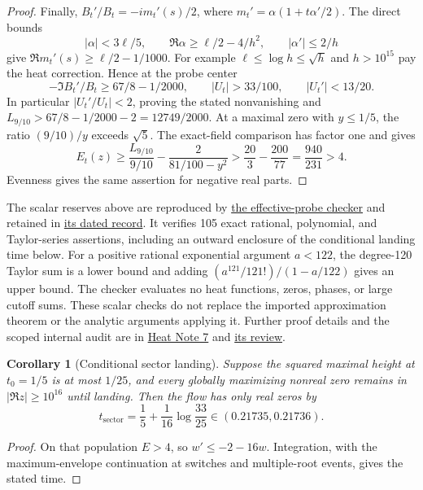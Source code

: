 \documentclass[11pt]{article}
\numberwithin{equation}{section}
\newtheorem{corollary}[theorem]{Corollary}
\theoremstyle{definition}
\theoremstyle{remark}
\begin{document}
\begin{proof}
Finally, \(B_t'/B_t=-im_t'(s)/2\), where
\(m_t'\!=\alpha(1+t\alpha'/2)\).
The direct bounds
\[
 |\alpha|<3\ell/5,\qquad
 \Re\alpha\ge\ell/2-4/h^2,\qquad |\alpha'|\le2/h
\]
give \(\Re m_t'(s)\ge\ell/2-1/1000\).
For example \(\ell\le\log h\le\sqrt h\) and \(h>10^{15}\)
pay the heat correction.  Hence at the probe center
\[
 -\Im B_t'/B_t\ge67/8-1/2000,\qquad
 |U_t|>33/100,\qquad |U_t'|<13/20.
\]
In particular \(|U_t'/U_t|<2\), proving the stated nonvanishing and
\(L_{9/10}>67/8-1/2000-2=12749/2000\).
At a maximal zero with \(y\le1/5\), the ratio \((9/10)/y\) exceeds
\(\sqrt5\).  The exact-field comparison has factor one and gives
\[
 E_t(z)\ge\frac{L_{9/10}}{9/10}
               -\frac2{81/100-y^2}
 >\frac{20}{3}-\frac{200}{77}=\frac{940}{231}>4.
\]
Evenness gives the same assertion for negative real parts.
\end{proof}

The scalar reserves above are reproduced by
\href{../numerics/check_effective_collective_probe.py}{the effective-probe checker}
and retained in
\href{../numerics/effective_collective_probe_record_20261009.json}{its dated record}.
It verifies 105 exact rational, polynomial, and Taylor-series assertions,
including an outward enclosure of the conditional landing time below.
For a positive rational exponential argument \(a<122\), the degree-120
Taylor sum is a lower bound and adding
\( (a^{121}/121!)/(1-a/122)\) gives an upper bound.
The checker evaluates no heat functions, zeros, phases, or large cutoff
sums.  These scalar checks do not replace the imported approximation
theorem or the analytic arguments applying it.  Further proof details and
the scoped internal audit are in
\href{notes/7_EFFECTIVE_COLLECTIVE_PROBE_AND_SPATIAL_COST_20261009.md}{Heat Note 7}
and
\href{../reviews/EFFECTIVE_COLLECTIVE_PROBE_REVIEW_20261009.md}{its review}.

\begin{corollary}[Conditional sector landing]
Suppose the squared maximal height at \(t_0=1/5\) is at most \(1/25\),
and every globally maximizing nonreal zero remains in
\(|\Re z|\ge10^{16}\) until landing.  Then the flow has only real zeros by
\[
 t_{\mathrm{sector}}=\frac15+\frac1{16}\log\frac{33}{25}
 \in(0.21735,0.21736).
\]
\end{corollary}
\begin{proof}
On that population \(E>4\), so \(w'\le-2-16w\).
Integration, with the maximum-envelope continuation at switches and
multiple-root events, gives the stated time.
\end{proof}
\end{document}
